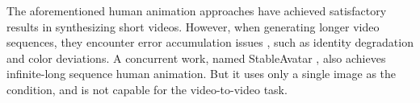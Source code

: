 The aforementioned human animation approaches have achieved satisfactory results in synthesizing short videos. However, when generating longer video sequences, they encounter error accumulation issues \cite{kong2025dam}, such as identity degradation and color deviations. A concurrent work, named StableAvatar \cite{stableavatar}, also achieves infinite-long sequence human animation. But it uses only a single image as the condition, and is not capable for the video-to-video task.
